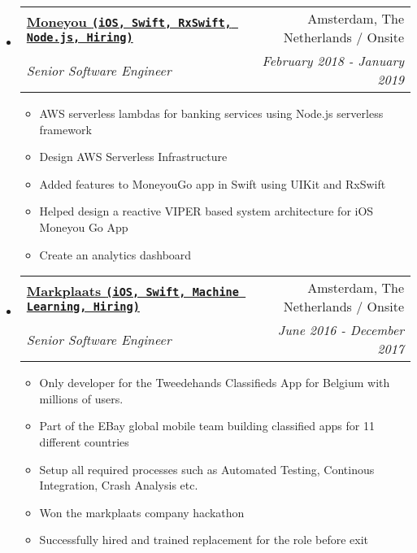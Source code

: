\documentclass[letterpaper,11pt]{article}
\makeatletter
\newcommand{\resitem}[1]{\item #1 \vspace{-2pt}}
\newcommand{\ressubheading}[4]{
\begin{tabular*}{7.0in}{l@{\extracolsep{\fill}}r}
    \textbf{#1} & #2 \\
    \textit{#3} & \textit{#4} \\
\end{tabular*}\vspace{-6pt}}
\makeatother
\begin{document}
\begin{itemize}
\item
    \ressubheading{\href{https://www.moneyou.nl/}{Moneyou \texttt{(iOS, Swift, RxSwift, Node.js, Hiring)}}}{Amsterdam, The Netherlands / Onsite}{Senior Software Engineer}{February 2018 - January 2019}
    \begin{itemize}
        \resitem{AWS serverless lambdas for banking services using Node.js serverless framework}
        \resitem{Design AWS Serverless Infrastructure}
        \resitem{Added features to MoneyouGo app in Swift using UIKit and RxSwift}
        \resitem{Helped design a reactive VIPER based system architecture for iOS Moneyou Go App}
        \resitem{Create an analytics dashboard}
    \end{itemize}
    
\item
    \ressubheading{\href{https://www.markplaats.nl/}{Markplaats \texttt{(iOS, Swift, Machine Learning, Hiring)}}}{Amsterdam, The Netherlands / Onsite}{Senior Software Engineer}{June 2016 - December 2017}
    \begin{itemize}
        \resitem{Only developer for the Tweedehands Classifieds App for Belgium with millions of users.}
        \resitem{Part of the EBay global mobile team building classified apps for 11 different countries}
        \resitem{Setup all required processes such as Automated Testing, Continous Integration, Crash Analysis etc.}
        \resitem{Won the markplaats company hackathon}
        \resitem{Successfully hired and trained replacement for the role before exit}
    \end{itemize}


\end{itemize}

\vspace{0.2in}
\end{document}
